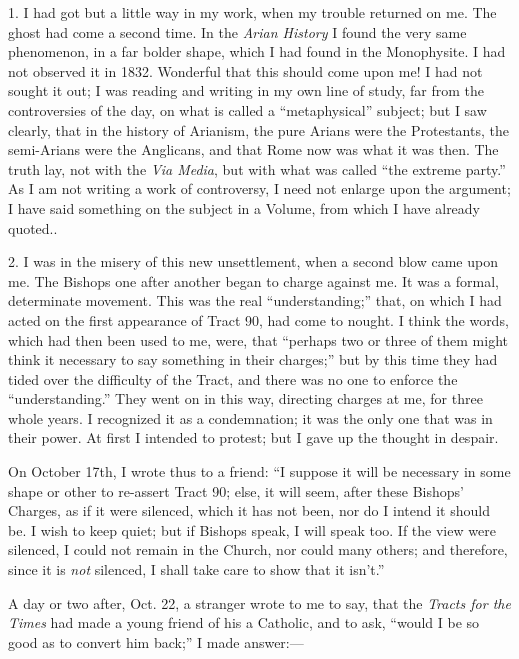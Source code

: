 1. I had got but a little way in my work, when my trouble returned on
me. The ghost had come a second time. In the \emph{Arian History} I found the
very same phenomenon, in a far bolder shape, which I had found in the
Monophysite. I had not observed it in 1832. Wonderful that this should
come upon me! I had not sought it out; I was reading and writing in my
own line of study, far from the controversies of the day, on what is
called a ``metaphysical'' subject; but I saw clearly, that in
the history of Arianism, the pure Arians were the Protestants, the
semi-Arians were the Anglicans, and that Rome now was what it was then. The truth lay, not with the \emph{Via Media}, but
with what was called ``the extreme party.'' As I am not writing a
work of controversy, I need not enlarge upon the argument; I have said
something on the subject in a Volume, from which I have already quoted..

2. I was in the misery of this new unsettlement, when a second blow
came upon me. The Bishops one after another began to charge against me.
It was a formal, determinate movement. This was the real
``understanding;'' that, on which I had acted on the first
appearance of Tract 90, had come to nought. I think the words, which had then
been used to me, were, that ``perhaps two or three of them
might think it necessary to say something in their charges;'' but by
this time they had tided over the difficulty of the Tract, and there was
no one to enforce the ``understanding.'' They went on in this
way, directing charges at me, for three whole years. I recognized it as a condemnation; it was the only one that was in their power. At
first I intended to protest; but I gave up the thought in despair.

On October 17th, I wrote thus to a friend: ``I suppose it will be
necessary in some shape or other to re-assert Tract 90; else, it will
seem, after these Bishops' Charges, as if it were silenced, which it has
not been, nor do I intend it should be. I wish to keep quiet; but if
Bishops speak, I will speak too. If the view were silenced, I could not
remain in the Church, nor could many others; and therefore, since it is \emph{not}
silenced, I shall take care to show that it isn't.''

A day or two after, Oct. 22, a stranger wrote to me to say, that the \emph{Tracts for the Times} had made a young friend of his a Catholic, and to
ask, ``would I be so good as to convert him back;'' I made
answer:—

